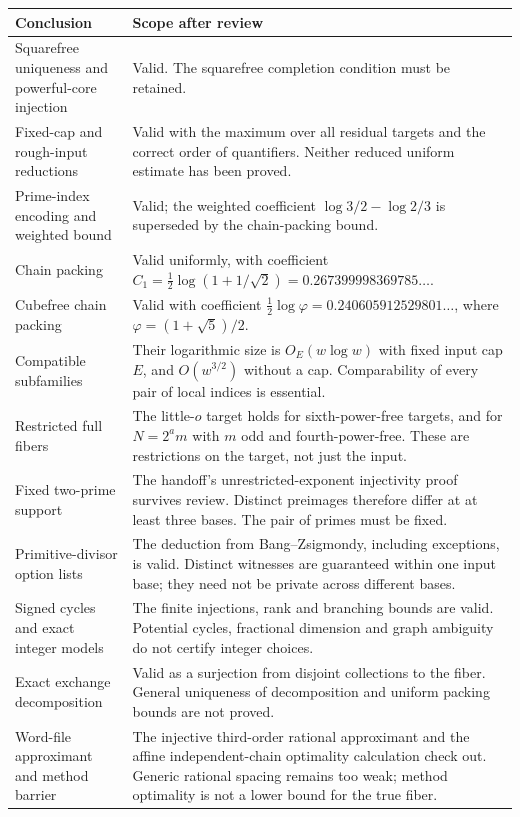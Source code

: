 \documentclass[11pt,a4paper]{article}
\theoremstyle{remark}
\begin{document}
\begin{longtable}{@{}P{.31\textwidth}P{.63\textwidth}@{}}
\toprule
Conclusion & Scope after review\\
\midrule\endhead
Squarefree uniqueness and powerful-core injection &
Valid. The squarefree completion condition must be retained.\\[3pt]
Fixed-cap and rough-input reductions &
Valid with the maximum over all residual targets and the correct order of
quantifiers. Neither reduced uniform estimate has been proved.\\[3pt]
Prime-index encoding and weighted bound &
Valid; the weighted coefficient $\log3/2-\log2/3$ is superseded by the
chain-packing bound.\\[3pt]
Chain packing &
Valid uniformly, with coefficient
$C_1=\tfrac12\log(1+1/\sqrt2)=0.267399998369785\ldots$.\\[3pt]
Cubefree chain packing &
Valid with coefficient $\tfrac12\log\varphi=0.240605912529801\ldots$,
where $\varphi=(1+\sqrt5)/2$.\\[3pt]
Compatible subfamilies &
Their logarithmic size is $O_E(w\log w)$ with fixed input cap $E$, and
$O(w^{3/2})$ without a cap. Comparability of every pair of local indices
is essential.\\[3pt]
Restricted full fibers &
The little-$o$ target holds for sixth-power-free targets, and for
$N=2^a m$ with $m$ odd and fourth-power-free. These are restrictions on the
target, not just the input.\\[3pt]
Fixed two-prime support &
The handoff's unrestricted-exponent injectivity proof survives review.
Distinct preimages therefore differ at at least three bases. The pair of
primes must be fixed.\\[3pt]
Primitive-divisor option lists &
The deduction from Bang--Zsigmondy, including exceptions, is valid.
Distinct witnesses are guaranteed within one input base; they need not be
private across different bases.\\[3pt]
Signed cycles and exact integer models &
The finite injections, rank and branching bounds are valid. Potential cycles,
fractional dimension and graph ambiguity do not certify integer choices.\\[3pt]
Exact exchange decomposition &
Valid as a surjection from disjoint collections to the fiber. General
uniqueness of decomposition and uniform packing bounds are not proved.\\[3pt]
Word-file approximant and method barrier &
The injective third-order rational approximant and the affine independent-chain
optimality calculation check out. Generic rational spacing remains too weak;
method optimality is not a lower bound for the true fiber.\\
\bottomrule
\end{longtable}
\end{document}

